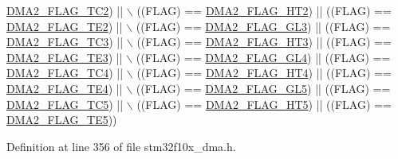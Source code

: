 \begin{DoxyCode}
      \hyperlink{group___d_m_a__flags__definition_ga7da2f61b8c67923904312796fd76def3}{DMA2\_FLAG\_TC2}) || \(\backslash\)
                               ((FLAG) == \hyperlink{group___d_m_a__flags__definition_gaa4ecfdaca0509737af68143d23d0267c}{DMA2\_FLAG\_HT2}) || ((FLAG) == 
      \hyperlink{group___d_m_a__flags__definition_ga3d396b14851e789ad549126da55b7f3f}{DMA2\_FLAG\_TE2}) || \(\backslash\)
                               ((FLAG) == \hyperlink{group___d_m_a__flags__definition_ga4c56bb0c92db51e9147b122f2dff1c0a}{DMA2\_FLAG\_GL3}) || ((FLAG) == 
      \hyperlink{group___d_m_a__flags__definition_ga3b704db8a45d4410509f3552e8b2095f}{DMA2\_FLAG\_TC3}) || \(\backslash\)
                               ((FLAG) == \hyperlink{group___d_m_a__flags__definition_ga1af48c549d9aa04e8161cb8b398ef39c}{DMA2\_FLAG\_HT3}) || ((FLAG) == 
      \hyperlink{group___d_m_a__flags__definition_gacdf472c665395a07681a7d499ac0f0bb}{DMA2\_FLAG\_TE3}) || \(\backslash\)
                               ((FLAG) == \hyperlink{group___d_m_a__flags__definition_ga624ff69707b76813a2170e4b1e0bda71}{DMA2\_FLAG\_GL4}) || ((FLAG) == 
      \hyperlink{group___d_m_a__flags__definition_gad4f76b7a22233dbb9daaad448c431165}{DMA2\_FLAG\_TC4}) || \(\backslash\)
                               ((FLAG) == \hyperlink{group___d_m_a__flags__definition_ga3dde40e2dbcdb12e4c1a2a2b5a8b3a60}{DMA2\_FLAG\_HT4}) || ((FLAG) == 
      \hyperlink{group___d_m_a__flags__definition_gac1178b804cad45fe82236dbd2c25cc64}{DMA2\_FLAG\_TE4}) || \(\backslash\)
                               ((FLAG) == \hyperlink{group___d_m_a__flags__definition_gab0468b7a6e2fbdd5428da87252865623}{DMA2\_FLAG\_GL5}) || ((FLAG) == 
      \hyperlink{group___d_m_a__flags__definition_ga5ba4dce652a1a29bedbd7d8dc35ca4ec}{DMA2\_FLAG\_TC5}) || \(\backslash\)
                               ((FLAG) == \hyperlink{group___d_m_a__flags__definition_ga23aabf34428e04d7b46368e0b595a4d5}{DMA2\_FLAG\_HT5}) || ((FLAG) == 
      \hyperlink{group___d_m_a__flags__definition_gae57659b4349d03eb70db63bb2aa40505}{DMA2\_FLAG\_TE5}))
\end{DoxyCode}


Definition at line 356 of file stm32f10x\+\_\+dma.\+h.

